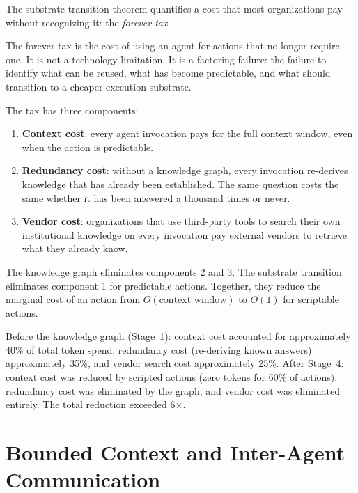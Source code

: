 \documentclass[11pt]{article}
\theoremstyle{definition}
\begin{document}
The substrate transition theorem quantifies a cost that most
organizations pay without recognizing it: the \emph{forever tax}.

The forever tax is the cost of using an agent for actions that no
longer require one. It is not a technology limitation. It is a
factoring failure: the failure to identify what can be reused, what
has become predictable, and what should transition to a cheaper
execution substrate.

The tax has three components:

\begin{enumerate}
\item \textbf{Context cost}: every agent invocation pays for the full
   context window, even when the action is predictable.

\item \textbf{Redundancy cost}: without a knowledge graph, every
   invocation re-derives knowledge that has already been established.
   The same question costs the same whether it has been answered a
   thousand times or never.

\item \textbf{Vendor cost}: organizations that use third-party tools to
   search their own institutional knowledge on every invocation pay
   external vendors to retrieve what they already know.
\end{enumerate}

The knowledge graph eliminates components 2 and 3. The substrate
transition eliminates component 1 for predictable actions. Together,
they reduce the marginal cost of an action from
$O(\text{context window})$ to $O(1)$ for scriptable actions.

Before the knowledge graph (Stage~1): context cost accounted for
approximately 40\% of total token spend, redundancy cost (re-deriving
known answers) approximately 35\%, and vendor search cost approximately
25\%. After Stage~4: context cost was reduced by scripted actions
(zero tokens for 60\% of actions), redundancy cost was eliminated by
the graph, and vendor cost was eliminated entirely. The total
reduction exceeded 6$\times$.

\section{Bounded Context and Inter-Agent Communication}
\label{sec:mapreduce}
\end{document}
